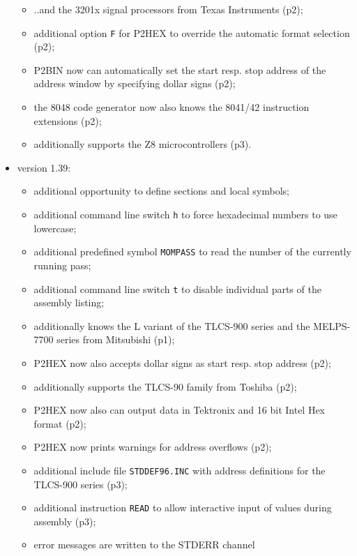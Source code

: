 \documentclass[12pt,twoside]{report}
\newcommand{\tty}[1]{{\tt #1}}
\begin{document}
\begin{itemize}
{\begin{itemize}
      \item{..and the 3201x signal processors from Texas
            Instruments (p2);}
      \item{additional option \tty{F} for P2HEX to override the
            automatic format selection (p2);}
      \item{P2BIN now can automatically set the start resp.
            stop address of the address window by specifying
            dollar signs (p2);}
      \item{the 8048 code generator now also knows the 8041/42
            instruction extensions (p2);}
      \item{additionally supports the Z8 microcontrollers (p3).}
      \end{itemize}}
\item{version 1.39:
      \begin{itemize}
      \item{additional opportunity to define sections and local
            symbols;}
      \item{additional command line switch \tty{h} to force hexadecimal
            numbers to use lowercase;}
      \item{additional predefined symbol \tty{MOMPASS} to read the
            number of the currently running pass;}
      \item{additional command line switch \tty{t} to disable
            individual parts of the assembly listing;}
      \item{additionally knows the L variant of the TLCS-900
            series and the MELPS-7700 series from Mitsubishi
            (p1);}
      \item{P2HEX now also accepts dollar signs as start resp.
            stop address (p2);}
      \item{additionally supports the TLCS-90 family from 
            Toshiba (p2);}
      \item{P2HEX now also can output data in Tektronix and
            16 bit Intel Hex format (p2);}
      \item{P2HEX now prints warnings for address overflows
            (p2);}
      \item{additional include file \tty{STDDEF96.INC} with address
            definitions for the TLCS-900 series (p3);}
      \item{additional instruction \tty{READ} to allow interactive
            input of values during assembly (p3);}
      \item{error messages are written to the STDERR channel
}
\end{itemize}}
\end{itemize}
\end{document}
